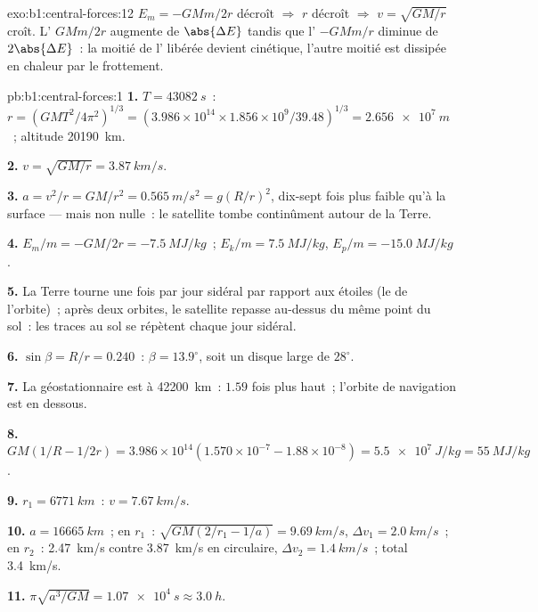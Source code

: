 \begin{solution}{exo:b1:central-forces:12}
$E_m = -GMm/2r$ décroît $\Rightarrow$ $r$ décroît $\Rightarrow$ $v =
\sqrt{GM/r}$ croît. L' $GMm/2r$ augmente de $\abs{\Delta E}$
tandis que l' $-GMm/r$ diminue de $2\abs{\Delta E}$~: la
moitié de l' libérée devient cinétique, l'autre
moitié est dissipée en chaleur par le frottement.
\end{solution}

\begin{solution}{pb:b1:central-forces:1}
\textbf{1.} $T = \qty{43082}{s}$~: $r = (GMT^2/4\pi^2)^{1/3} = (3.986\times10^{14}
\times 1.856\times10^9/39.48)^{1/3} = \qty{2.656e7}{m}$~; altitude
\qty{20190}{km}.

\textbf{2.} $v = \sqrt{GM/r} = \qty{3.87}{km/s}$.

\textbf{3.} $a = v^2/r = GM/r^2 = \qty{0.565}{m/s^2} = g(R/r)^2$, dix-sept
fois plus faible qu'à la surface --- mais non nulle~: le satellite tombe
continûment autour de la Terre.

\textbf{4.} $E_m/m = -GM/2r = \qty{-7.5}{MJ/kg}$~; $E_k/m = \qty{+7.5}{MJ/kg}$,
$E_p/m = \qty{-15.0}{MJ/kg}$.

\textbf{5.} La Terre tourne une fois par jour sidéral par rapport aux
étoiles (le  de l'orbite)~; après deux orbites, le satellite
repasse au-dessus du même point du sol~: les traces au sol se répètent
chaque jour sidéral.

\textbf{6.} $\sin\beta = R/r = 0.240$~: $\beta = 13.9^\circ$, soit un
disque large de $28^\circ$.

\textbf{7.} La géostationnaire est à \qty{42200}{km}~: $1.59$ fois plus
haut~; l'orbite de navigation est en dessous.

\textbf{8.} $GM(1/R - 1/2r) = 3.986\times10^{14}(1.570\times10^{-7} - 1.88\times
10^{-8}) = \qty{5.5e7}{J/kg} = \qty{55}{MJ/kg}$.

\textbf{9.} $r_1 = \qty{6771}{km}$~: $v = \qty{7.67}{km/s}$.

\textbf{10.} $a = \qty{16665}{km}$~; en $r_1$~: $\sqrt{GM(2/r_1 - 1/a)} =
\qty{9.69}{km/s}$, $\Delta v_1 = \qty{2.0}{km/s}$~; en $r_2$~: \qty{2.47}{km/s}
contre \qty{3.87}{km/s} en circulaire, $\Delta v_2 = \qty{1.4}{km/s}$~; total
\qty{3.4}{km/s}.

\textbf{11.} $\pi\sqrt{a^3/GM} = \qty{1.07e4}{s} \approx \qty{3.0}{h}$.


\end{solution}
